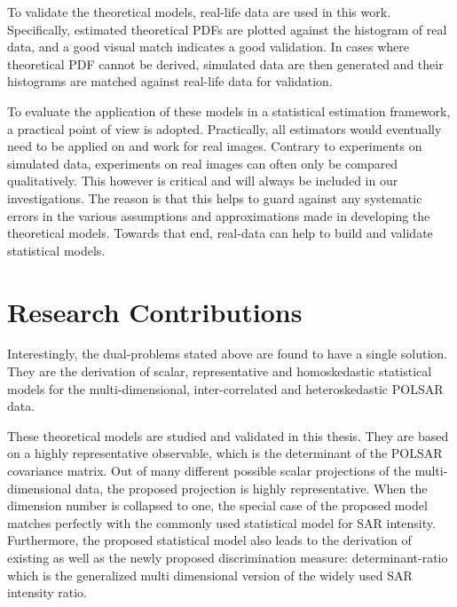 To validate the theoretical models,  real-life data are used in this work.
Specifically, estimated theoretical PDFs are plotted against the histogram of real data,
  and a good visual match indicates a good validation.
In cases where theoretical PDF cannot be derived, simulated data are then generated
  and their histograms are matched against real-life data for validation.


To evaluate the application of these models in a statistical estimation framework, a practical point of view is adopted.
Practically, all estimators would eventually need to be applied on and work for real images.
Contrary to experiments on simulated data, experiments on real images can often only be compared qualitatively.
This however is critical and will always be included in our investigations.
The reason is that this helps to guard against any systematic errors in the various assumptions and approximations made in developing the theoretical models.
Towards that end, real-data can help to build and validate statistical models.

\section{Research Contributions}
Interestingly, the dual-problems stated above are found to have a single solution.
They are the derivation of scalar, representative and homoskedastic statistical models for the multi-dimensional, inter-correlated and heteroskedastic POLSAR data.

These theoretical models are studied and validated in this thesis.
They are based on a highly representative observable, which is the determinant of the POLSAR covariance matrix.
Out
                of many different possible scalar projections of the
                multi-dimensional data, the proposed projection is
                highly representative.
When the dimension number is collapsed to one, the
                special case of the proposed model matches perfectly
                with the commonly used statistical model for SAR
                intensity.
Furthermore,
                the proposed statistical model also leads to the
                derivation of existing as well as the newly proposed
                discrimination measure: determinant-ratio which is the
                generalized multi dimensional version of the widely used
                SAR intensity ratio.

